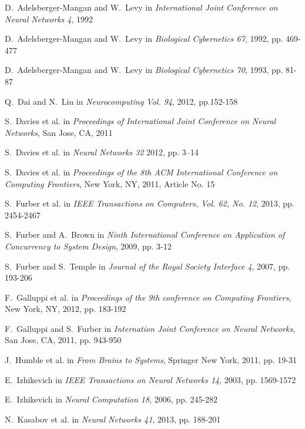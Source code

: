 \documentclass[journal]{./sty/IEEEtran}
\begin{document}
\begin{thebibliography}{23}

D.~Adelsberger-Mangan and W.~Levy in \emph{International Joint Conference on Neural Networks 4}, 1992

D.~Adelsberger-Mangan and W.~Levy in \emph{Biological Cybernetics 67}, 1992, pp. 469-477

D.~Adelsberger-Mangan and W.~Levy in \emph{Biological Cybernetics 70}, 1993, pp. 81-87

Q.~Dai and N.~Liu in \emph{Neurocomputing Vol. 94}, 2012, pp.152-158

S.~Davies et al. in \emph{Proceedings of International Joint Conference on Neural Networks}, San Jose, CA, 2011

S.~Davies et al. in \emph{Neural Networks 32} 2012, pp. 3–14

S.~Davies et al. in \emph{Proceedings of the 8th ACM International Conference on Computing Frontiers}, New York, NY, 2011, Article No. 15 

S.~Furber et al. in \emph{IEEE Transactions on Computers, Vol. 62, No. 12}, 2013, pp. 2454-2467

S.~Furber and A.~Brown in \emph{Ninth International Conference on Application of Concurrency to System Design}, 2009, pp. 3-12

S.~Furber and S.~Temple in \emph{Journal of the Royal Society Interface 4}, 2007, pp. 193-206

F.~Galluppi et al. in \emph{Proceedings of the 9th conference on Computing Frontiers}, New York, NY, 2012, pp. 183-192

F.~Galluppi and S.~Furber in \emph{Internation Joint Conference on Neural Networks}, San Jose, CA, 2011, pp. 943-950 

J.~Humble et al. in \emph{From Brains to Systems}, Springer New York, 2011, pp. 19-31

E.~Izhikevich in \emph{IEEE Transactions on Neural Networks 14}, 2003, pp. 1569-1572

E.~Izhikevich in \emph{Neural Computation 18}, 2006, pp. 245-282

N.~Kasabov et al. in \emph{Neural Networks 41}, 2013, pp. 188-201


\end{thebibliography}
\end{document}
